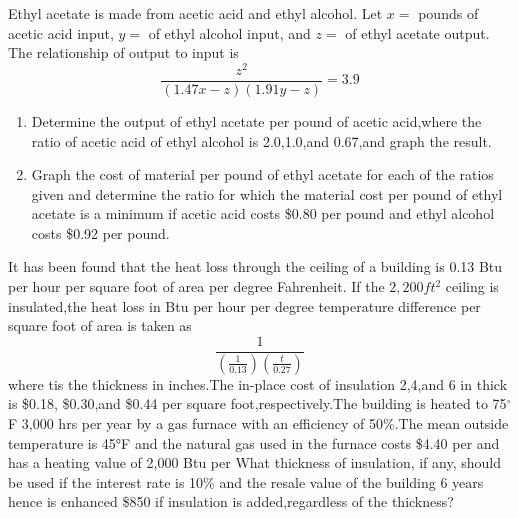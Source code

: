 \begin{exercises}
    \begin{exercise}
    \label{sea-9-5}
        Ethyl acetate is made from acetic acid and ethyl alcohol. Let $x=$ pounds of acetic acid input, $y=$ of ethyl alcohol input, and $z=$ of ethyl acetate output. The relationship of output to input is
        \begin{equation}
            \frac{z^2}{(1.47x-z)(1.91y-z)}=3.9
        \end{equation}
        \begin{enumerate}[label=\alph*)]
            \item Determine the output of ethyl acetate per pound of acetic acid,where the ratio of acetic acid of ethyl alcohol is 2.0,1.0,and 0.67,and graph the result.
            \item Graph the cost of material per pound of ethyl acetate for each of the ratios given and determine the ratio for which the material cost per pound of ethyl acetate is a minimum if acetic acid costs \$0.80 per pound and ethyl alcohol costs \$0.92 per pound.
        \end{enumerate}
    \end{exercise}
    \begin{solution}
    \end{solution}
    
    \begin{exercise}
    \label{sea-9-6}
        It has been found that the heat loss through the ceiling of a building is 0.13 Btu per hour per square foot of area per degree Fahrenheit. If the $2,200ft^2$ ceiling is insulated,the heat loss in Btu per hour per degree temperature difference per square foot of area is taken as
        \begin{equation}
            \frac{1}{(\frac{1}{0.13})(\frac{t}{0.27})}
        \end{equation}
        where tis the thickness in inches.The in-place cost of insulation 2,4,and 6 in thick is \$0.18, \$0.30,and \$0.44 per square foot,respectively.The building is heated to 75$^{\circ}$F 3,000 hrs per year by a gas furnace with an efficiency of 50\%.The mean outside temperature is 45°F and the natural gas used in the furnace costs \$4.40 per and has a heating value of 2,000 Btu per What thickness of insulation, if any, should be used if the interest rate is 10\% and the resale value of the building 6 years hence is enhanced \$850 if insulation is added,regardless of the thickness?
    \end{exercise}
    \begin{solution}
    \end{solution}
    

\end{exercises}
